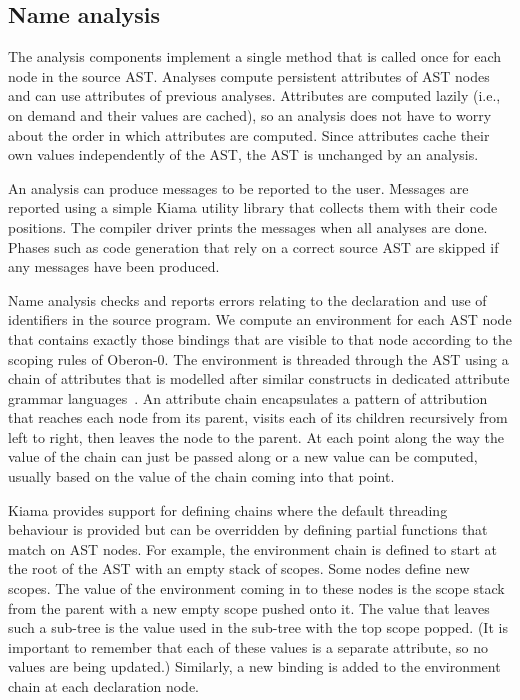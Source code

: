 \subsection{Name analysis}

The analysis components implement a single method that is called once for each node in the source AST.
Analyses compute persistent attributes of AST nodes and can use attributes of previous analyses.
Attributes are computed lazily (i.e., on demand and their values are cached), so an analysis does not have to worry about the order in which attributes are computed.
Since attributes cache their own values independently of the AST, the AST is unchanged by an analysis.

An analysis can produce messages to be reported to the user.
Messages are reported using a simple Kiama utility library that collects them with their code positions.
The compiler driver prints the messages when all analyses are done.
Phases such as code generation that rely on a correct source AST are skipped if any messages have been produced.

Name analysis checks and reports errors relating to the declaration and use of identifiers in the source program.
We compute an environment for each AST node that contains exactly those bindings that are visible to that node according to the scoping rules of Oberon-0.
The environment is threaded through the AST using a chain of attributes that is modelled after similar constructs in dedicated attribute grammar languages~\cite{Kastens94}.
An attribute chain encapsulates a pattern of attribution that reaches each node from its parent, visits each of its children recursively from left to right, then leaves the node to the parent.
At each point along the way the value of the chain can just be passed along or a new value can be computed, usually based on the value of the chain coming into that point.

Kiama provides support for defining chains where the default threading behaviour is provided but can be overridden by defining partial functions that match on AST nodes.
For example, the environment chain is defined to start at the root of the AST with an empty stack of scopes.
Some nodes define new scopes.
The value of the environment coming in to these nodes is the scope stack from the parent with a new empty scope pushed onto it.
The value that leaves such a sub-tree is the value used in the sub-tree with the top scope popped.
(It is important to remember that each of these values is a separate attribute, so no values are being updated.)
Similarly, a new binding is added to the environment chain at each declaration node.

